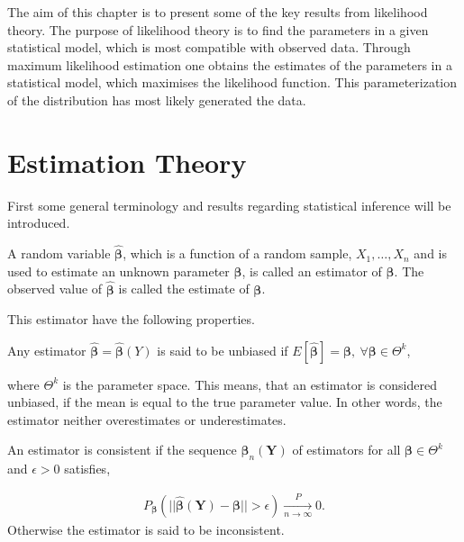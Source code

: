 The aim of this chapter is to present some of the key results from likelihood theory. 
The purpose of likelihood theory is to find the parameters in a given statistical model, which is most compatible with observed data. 
Through maximum likelihood estimation one obtains the estimates of the parameters in a statistical model, which maximises the likelihood function. 
This parameterization of the distribution has most likely generated the data. \\

\section{Estimation Theory}

First some general terminology and results regarding statistical inference will be introduced.

\begin{definition} 
    A random variable $\boldsymbol{\hat{\beta}}$, which is a function of a random sample, $X_1, \ldots, X_n$ and is used to estimate an unknown parameter $\boldsymbol{\beta}$, is called an estimator of $\boldsymbol{\beta}$. The observed value of $\boldsymbol{\hat{\beta}}$ is called the estimate of $\boldsymbol{\beta}$.
\end{definition}

This estimator have the following properties. 

\begin{definition}
\label{def:Unbiased_estmator}
Any estimator $\boldsymbol{\hat{\beta}} = \boldsymbol{\hat{\beta}}(Y)$ is said to be unbiased if $E[\boldsymbol{\hat{\beta}}] = \boldsymbol{\beta}, \ \forall \boldsymbol{\beta} \in \Theta^k$,
\end{definition}

where $\Theta^k$ is the parameter space. This means, that an estimator is considered unbiased, if the mean is equal to the true parameter value. 
In other words, the estimator neither overestimates or underestimates.

\begin{definition} 
\label{def:consistent_estimator}
An estimator is consistent if the sequence $\boldsymbol{\beta}_n(\textbf{Y})$ of estimators for all $\boldsymbol{\beta} \in \Theta^k$ and $\epsilon > 0$ satisfies,

\begin{align*}
    P_{\boldsymbol{\beta}}(||\hat{\boldsymbol{\beta}}(\textbf{Y}) - \boldsymbol{\beta}|| > \epsilon) \xrightarrow[n \rightarrow \infty]{P} 0.
\end{align*}
Otherwise the estimator is said to be inconsistent.
\end{definition}

